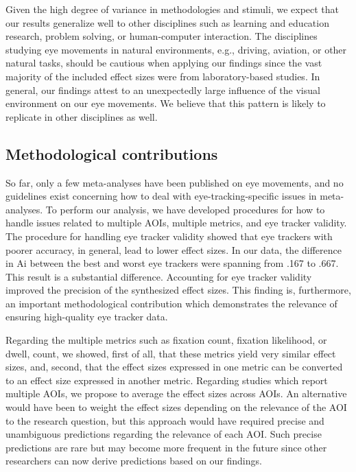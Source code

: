 \documentclass{article}
\begin{document}
Given the high degree of variance in methodologies and stimuli, we expect that our results generalize well to other disciplines such as learning and education research, problem solving, or human-computer interaction. The disciplines studying eye movements in natural environments, e.g., driving, aviation, or other natural tasks, should be cautious when applying our findings since the vast majority of the included effect sizes were from laboratory-based studies. In general, our findings attest to an unexpectedly large influence of the visual environment on our eye movements. We believe that this pattern is likely to replicate in other disciplines as well.


\subsection{Methodological contributions}

So far, only a few meta-analyses have been published on eye movements, and no guidelines exist concerning how to deal with eye-tracking-specific issues in meta-analyses. To perform our analysis, we have developed procedures for how to handle issues related to multiple AOIs, multiple metrics, and eye tracker validity. The procedure for handling eye tracker validity showed that eye trackers with poorer accuracy, in general, lead to lower effect sizes. In our data, the difference in Ai between the best and worst eye trackers were spanning from .167 to .667. This result is a substantial difference. Accounting for eye tracker validity improved the precision of the synthesized effect sizes. This finding is, furthermore, an important methodological contribution which demonstrates the relevance of ensuring high-quality eye tracker data.

Regarding the multiple metrics such as fixation count, fixation likelihood, or dwell, count, we showed, first of all, that these metrics yield very similar effect sizes, and, second, that the effect sizes expressed in one metric can be converted to an effect size expressed in another metric. Regarding studies which report multiple AOIs, we propose to average the effect sizes across AOIs. An alternative would have been to weight the effect sizes depending on the relevance of the AOI to the research question, but this approach would have required precise and unambiguous predictions regarding the relevance of each AOI. Such precise predictions are rare but may become more frequent in the future since other researchers can now derive predictions based on our findings.   
\end{document}
